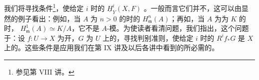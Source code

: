 我们将寻找条件\footnote{参见第 VIII 讲。}，使给定 $i$ 时的 $\underline H_Y^i(X,F)$ 。一般而言它们并不，这可以由显然的例子看出：例如，当 $A$ 为 $n>0$ 的时的 $H_{\mathfrak m}^n(A)$；再如，当 $A$ 为为 $K$ 的时，
$H_{\mathfrak m}^1(A)\simeq K/A$，它不是 $A$-模。为使读者看清问题，我们指出，这个问题于：设 $f:U\to X$ 为开，$G$ 为 $U$ 上的，寻找判别准则，使给定 $i$ 时的 $R^if_*G$ 是 $X$ 上的。这些条件是应用我们在第 IX 讲及以后各讲中看到的所必需的。
